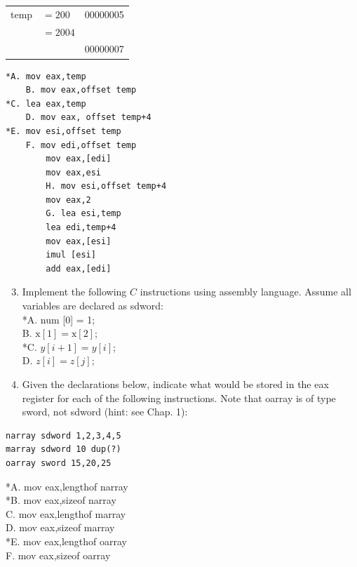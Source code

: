 \documentclass[10pt]{book}
\begin{document}
\begin{center}
\begin{tabular}{lll}
\hline
temp & $=200$  & 00000005 \\
     & $=2004$ &          \\
     &         & 00000007 \\
\hline
\end{tabular}
\end{center}

\begin{verbatim}
*A. mov eax,temp
    B. mov eax,offset temp
*C. lea eax,temp
    D. mov eax, offset temp+4
*E. mov esi,offset temp
    F. mov edi,offset temp
        mov eax,[edi]
        mov eax,esi
        H. mov esi,offset temp+4
        mov eax,2
        G. lea esi,temp
        lea edi,temp+4
        mov eax,[esi]
        imul [esi]
        add eax,[edi]
\end{verbatim}

\begin{enumerate}
  \setcounter{enumi}{2}
  \item Implement the following $C$ instructions using assembly language. Assume all variables are declared as sdword:\\
*A. num [0] = 1;\\
B. $\mathrm{x}[1]=\mathrm{x}[2]$;\\
*C. $y[i+1]=y[i]$;\\
D. $z[i]=z[j] ;$
  \item Given the declarations below, indicate what would be stored in the eax register for each of the following instructions. Note that oarray is of type sword, not sdword (hint: see Chap. 1):
\end{enumerate}

\begin{verbatim}
narray sdword 1,2,3,4,5
marray sdword 10 dup(?)
oarray sword 15,20,25
\end{verbatim}

*A. mov eax,lengthof narray\\
*B. mov eax,sizeof narray\\
C. mov eax,lengthof marray\\
D. mov eax,sizeof marray\\
*E. mov eax,lengthof oarray\\
F. mov eax,sizeof oarray\\
\end{document}
